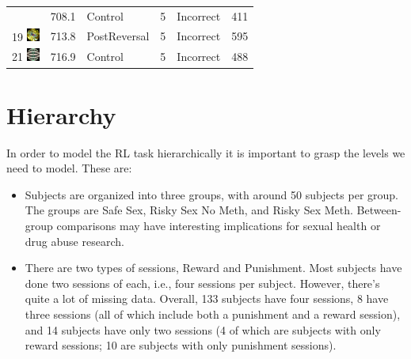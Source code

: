 \documentclass[]{article}
\providecommand{\tightlist}{%
  \setlength{\itemsep}{0pt}\setlength{\parskip}{0pt}}
\begin{document}
\begin{longtable}[]{@{}lrlrll@{}}
& 708.1 & Control & 5 & Incorrect & 411\tabularnewline
19
\includegraphics[width=0.16670in,height=0.16670in]{../ReversalLearning_20130621/images/abs19.jpg}
& 713.8 & PostReversal & 5 & Incorrect & 595\tabularnewline
21
\includegraphics[width=0.16670in,height=0.16670in]{../ReversalLearning_20130621/images/abs21.jpg}
& 716.9 & Control & 5 & Incorrect & 488\tabularnewline
\bottomrule
\end{longtable}

\section{Hierarchy}\label{hierarchy}

In order to model the RL task hierarchically it is important to grasp
the levels we need to model. These are:

\begin{itemize}
\tightlist
\item
  Subjects are organized into three groups, with around 50 subjects per
  group. The groups are Safe Sex, Risky Sex No Meth, and Risky Sex Meth.
  Between-group comparisons may have interesting implications for sexual
  health or drug abuse research.
\item
  There are two types of sessions, Reward and Punishment. Most subjects
  have done two sessions of each, i.e., four sessions per subject.
  However, there's quite a lot of missing data. Overall, 133 subjects
  have four sessions, 8 have three sessions (all of which include both a
  punishment and a reward session), and 14 subjects have only two
  sessions (4 of which are subjects with only reward sessions; 10 are
  subjects with only punishment sessions).
\end{itemize}
\end{document}
